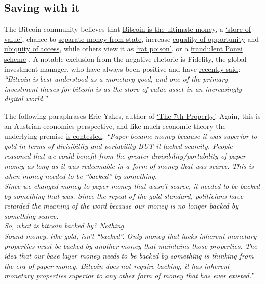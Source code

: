 \subsection{Saving with it} 
The Bitcoin community believes that \href{https://svetski.medium.com/why-bitcoin-not-shitcoin-6cc826f4fa52}{Bitcoin is the ultimate money}, a \href{https://www.coindesk.com/business/2022/01/07/jpmorgan-sees-more-crypto-adoption-in-2022-debates-bitcoins-status-as-store-of-value/}{`store of value'}, chance to \href{https://www.forbes.com/sites/leeorshimron/2020/06/30/bitcoin-is-the-separation-of-money-and-state/?sh=49294a8356db}{separate money from state}, increase \href{https://www.washingtonpost.com/national/locked-out-of-traditional-financial-industry-more-people-of-color-are-turning-to-cryptocurrency/2021/12/01/a21df3fa-37fe-11ec-9bc4-86107e7b0ab1_story.html}{equality of opportunity} and \href{https://iai.tv/articles/the-rich-get-richer-the-poor-get-bitcoin-auid-1766}{ubiquity of access}, while others view it as \href{https://www.cnbc.com/2021/06/22/a-third-of-investors-think-bitcoin-is-rat-poison-jpmorgan-survey-says.html}{`rat poison'}, or a \href{https://jacobinmag.com/2022/01/cryptocurrency-scam-blockchain-bitcoin-economy-decentralization}{fraudulent Ponzi scheme} \cite{ponzi2021alden}. A notable exclusion from the negative rhetoric is Fidelity, the global investment manager, who have always been positive and have \href{https://www.fidelitydigitalassets.com/articles/bitcoin-first?sf253214177=1}{recently said}: 
\textit{``Bitcoin is best understood as a monetary good, and one of the primary investment theses for bitcoin is as the store of value asset in an increasingly digital world.''}\par
The following paraphrases Eric Yakes, author of \href{https://yakes.io/book/}{`The 7th Property'}. Again, this is an Austrian economics perspective, and like much economic theory the underlying premise \href{https://medium.datadriveninvestor.com/do-you-understand-the-austrian-vs-keynesian-economic-debate-2f4b152c6a6b}{is contested}\cite{maurel2012keynesian}: \textit{``Paper became money because it was superior to gold in terms of divisibility and portability BUT it lacked scarcity. People reasoned that we could benefit from the greater divisibility/portability of paper money as long as it was redeemable in a form of money that was scarce. This is when money needed to be ``backed'' by something. \\
Since we changed money to paper money that wasn't scarce, it needed to be backed by something that was. Since the repeal of the gold standard, politicians have retarded the meaning of the word because our money is no longer backed by something scarce.\\
So, what is bitcoin backed by? Nothing.\\
Sound money, like gold, isn’t ``backed''.
Only money that lacks inherent monetary properties must be backed by another money that maintains those properties. The idea that our base layer money needs to be backed by something is thinking from the era of paper money. Bitcoin does not require backing, it has inherent monetary properties superior to any other form of money that has ever existed.''}\par
